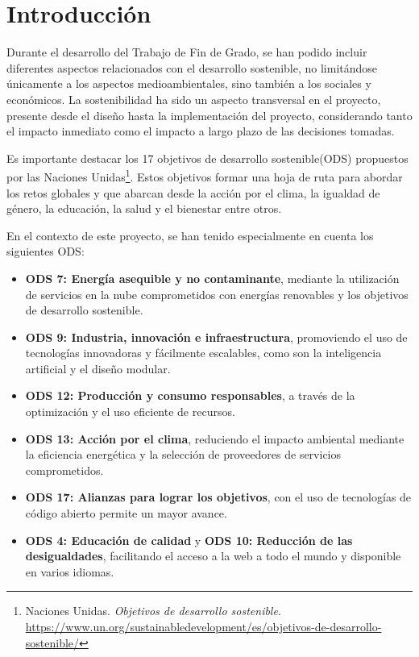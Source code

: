 
\section{Introducción}

Durante el desarrollo del Trabajo de Fin de Grado, se han podido incluir diferentes aspectos relacionados con el desarrollo sostenible, no limitándose únicamente a los aspectos medioambientales, sino también a los sociales y económicos. La sostenibilidad ha sido un aspecto transversal en el proyecto, presente desde el diseño hasta la implementación del proyecto, considerando tanto el impacto inmediato como el impacto a largo plazo de las decisiones tomadas. 

Es importante destacar los 17 objetivos de desarrollo sostenible(ODS) propuestos por las Naciones Unidas\footnote{Naciones Unidas. \textit{Objetivos de desarrollo sostenible}. \url{https://www.un.org/sustainabledevelopment/es/objetivos-de-desarrollo-sostenible/}}. Estos objetivos formar una hoja de ruta para abordar los  retos globales y que abarcan desde la acción por el clima, la igualdad de género, la educación, la salud y el bienestar entre otros.

En el contexto de este proyecto, se han tenido especialmente en cuenta los siguientes ODS:

\begin{itemize}
    \item \textbf{ODS 7: Energía asequible y no contaminante}, mediante la utilización de servicios en la nube comprometidos con energías renovables y los objetivos de desarrollo sostenible.
    \item \textbf{ODS 9: Industria, innovación e infraestructura}, promoviendo el uso de tecnologías innovadoras y fácilmente escalables, como son la inteligencia artificial y el diseño modular.
    \item \textbf{ODS 12: Producción y consumo responsables}, a través de la optimización y el uso eficiente de recursos.
    \item \textbf{ODS 13: Acción por el clima}, reduciendo el impacto ambiental mediante la eficiencia energética y la selección de proveedores de servicios comprometidos.
    \item \textbf{ODS 17: Alianzas para lograr los objetivos}, con el uso de tecnologías de código abierto permite un mayor avance.
    \item \textbf{ODS 4: Educación de calidad} y \textbf{ODS 10: Reducción de las desigualdades}, facilitando el acceso a la web a todo el mundo y disponible en varios idiomas.
\end{itemize}




